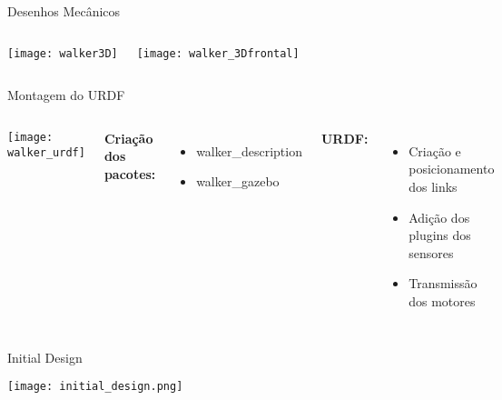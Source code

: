 \begin{frame}[t]{Desenhos Mecânicos} 
    \begin{columns}
        \texttt{[image: walker3D]}

        \texttt{[image: walker\_3Dfrontal]}

    \end{columns}
\end{frame}


\begin{frame}[t]{Montagem do URDF} 
    \begin{columns}
        \centering
        \texttt{[image: walker\_urdf]}

        \textbf{Criação dos pacotes:}
        \begin{itemize}
            \item walker\_description
            \item walker\_gazebo
        \end{itemize}
        \vspace{.5cm}
        \textbf{URDF:}
        \begin{itemize}
            \item Criação e posicionamento dos links
            \item Adição dos plugins dos sensores
            \item Transmissão dos motores
        \end{itemize}
    \end{columns}
\end{frame}

\begin{frame}[t]{Initial Design} 

    \centering
    \texttt{[image: initial\_design.png]}

\end{frame}


